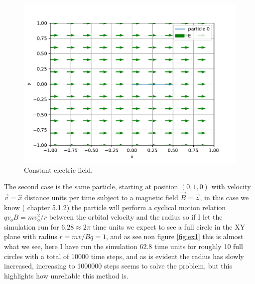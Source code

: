 \documentclass[a4paper,12pt,article]{memoir}
\begin{document}
\begin{figure}
\includegraphics[width=\linewidth]{ex0.pdf}
\caption{Constant electric field.}
\label{fig:ex0}
\end{figure}

The second case is the same particle, starting at position $(0,1,0)$ with velocity $\vec{v}=\hat{x}$ distance units per time subject to a magnetic field $\vec{B}=\vec{z}$, in this case we know (\cite{griff} chapter 5.1.2) the particle will perform a cyclical motion relation $q v_o B= m v_{o}^2/r$ between the orbital velocity and the radius so if I let the simulation run for  $6.28\approx 2 \pi$ time units we expect to see a full circle in the XY plane with radius $r= m v/Bq = 1$, and as see non figure \ref{fig:ex1} this is almost what we see, here I have run the simulation $62.8$ time units for roughly 10 full circles with a total of 10000 time steps, and as is evident the radius has slowly increased, increasing to 1000000 steps seems to solve the problem, but this highlights how unreliable this method is.
\end{document}
